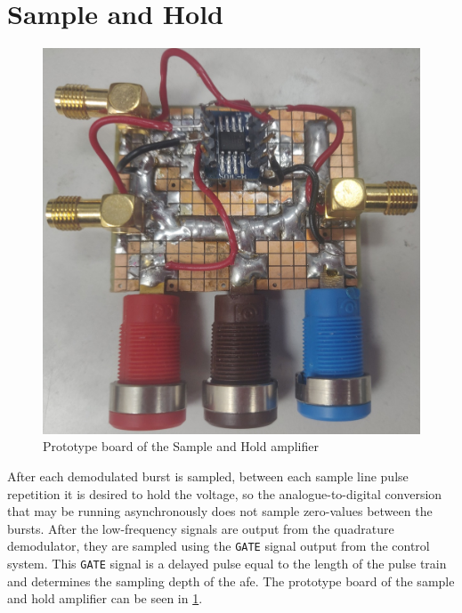 \section{Sample and Hold}
\begin{figure}[htbp]
	\centering
	\includegraphics[width=.8\textwidth]{Figures/4_sha_pcb_pic.jpg}
	\caption{Prototype board of the Sample and Hold amplifier}
	\label{fig:4_sha_pcb_pic}
\end{figure}

After each demodulated burst is sampled, between each sample line pulse repetition it is desired to hold the voltage, so the analogue-to-digital conversion that may be running asynchronously does not sample zero-values between the bursts. After the low-frequency signals are output from the quadrature demodulator, they are sampled using the \texttt{GATE} signal output from the control system. This \texttt{GATE} signal is a delayed pulse equal to the length of the pulse train and determines the sampling depth of the \gls{afe}. The prototype board of the sample and hold amplifier can be seen in \cref{fig:4_sha_pcb_pic}.

